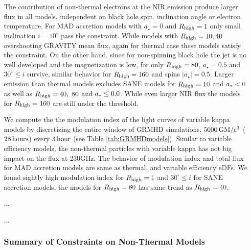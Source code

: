 The contribution of non-thermal electrons at the NIR emission produce larger flux in all models, independent on black hole spin, inclination angle or electron temperature. For MAD accretion models with $a_{\star}=0$ and $R_{\rm high}=1$ only small inclination $i=10^{\circ}$ pass the constraint. While models with $R_{\rm high}=10,40$ overshooting GRAVITY mean flux, again for thermal case these models satisfy the constraint. On the other hand, since for non-spinning black hole the jet is no well developed and the magnetization is low, for only  $R_{\rm high}=80$, $a_{\star}=0.5$ and $30^{\circ} \leq i$ survive, similar behavior for $R_{\rm high}=160$ and spins $|a_{\star}|=0.5$.
Larger emission than thermal models excludes SANE models for $R_{\rm high}=10$ and $a_* < 0$ as well as  $R_{\rm high}=40,~80$ and $a_* \leq 0.0$. While even larger NIR flux the models for $R_{\rm high}=160$ are still under the threshold.


We compute the the modulation index  of the light curves of variable kappa models by discretizing the entire window of GRMHD simulations, $\rm 5000\,GM/c^3$ ($\rm 28\,hours$) every $\rm 3\,hour$ (see Table \ref{tab:GRMHDmodels}). Similar to variable efficiency models, the non-thermal particles with variable kappa has not big impact on the flux at 230GHz. The behavior of modulation index and total flux for MAD accretion models are same as thermal, and variable efficiency eDFs. We found sightly high modulation index for $R_{\rm high}=1$ and $30^{\circ} \leq i$ for SANE accretion models, the models for $R_{\rm high}=80$ has same trend as $R_{\rm high}=40$.



...


...

\subsubsection{Summary of Constraints on Non-Thermal Models}

